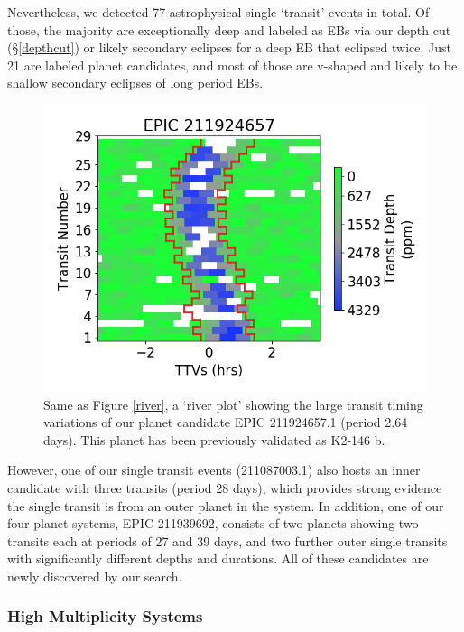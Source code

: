 \documentclass[twocolumn]{aastex62}
\newcommand{\singletrantot}{77}
\newcommand{\singletranplan}{21}
\begin{document}
Nevertheless, we detected \singletrantot{} astrophysical single
`transit' events in total. Of those, the majority are exceptionally
deep and labeled as EBs via our depth cut (\S\ref{depthcut}) or likely
secondary eclipses for a deep EB that eclipsed twice. Just
\singletranplan{} are labeled planet candidates, and most of those are
v-shaped and likely to be shallow secondary eclipses of long period
EBs.

\begin{figure}[tbp]
\includegraphics[width=\columnwidth]{ttvriver.png}
\caption{Same as Figure \ref{river}, a `river plot' showing the large
  transit timing variations of our planet candidate EPIC 211924657.1
  (period 2.64 days). This planet has been previously validated as
  K2-146 b. \label{ttvriver}}
\end{figure}

However, one of our single transit events (211087003.1) also hosts an
inner candidate with three transits (period 28 days), which provides
strong evidence the single transit is from an outer planet in the
system. In addition, one of our four planet systems, EPIC 211939692,
consists of two planets showing two transits each at periods of 27 and
39 days, and two further outer single transits with significantly
different depths and durations. All of these candidates are newly
discovered by our search.


\subsubsection{High Multiplicity Systems}
\label{sec:multis}
\end{document}
